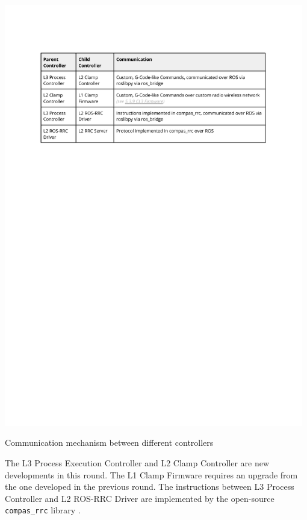 \begin{table}
    \includegraphics[page=1, trim=25.4mm 195mm 25.4mm 33mm, clip, width=0.98\textwidth]{tables/Tables in Chapter 5.pdf}
    \caption{Communication mechanism between different controllers}
    \label{table:communication-mechanism-between-controllers}
\end{table}


The L3 Process Execution Controller  and L2 Clamp Controller  are new developments in this round. The L1 Clamp Firmware  requires an upgrade from the one developed in the previous round. The instructions between L3 Process Controller and L2 ROS-RRC Driver are implemented by the open-source \verb|compas_rrc| library \parencite{fleischmannCOMPASRRCOnline2020}. 


